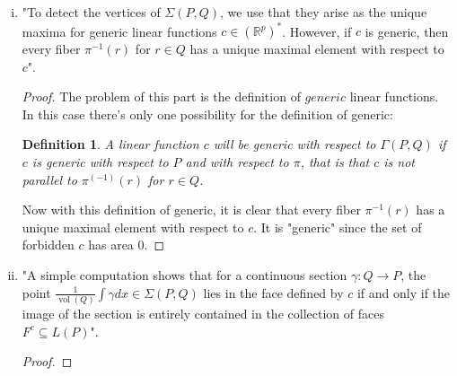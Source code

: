 \documentclass[11pt]{article}
\newtheorem{definition}{Definition}[section]
\DeclareMathOperator{\vol}{vol}
\begin{document}
\begin{enumerate}
\begin{enumerate}[(i)]
\begin{proof}

\end{proof}


\item "To detect the vertices of $\Sigma(P, Q)$, we use that they arise as the unique maxima for generic linear functions $c \in (\mathbb{R}^p)^*$. However, if $c$ is generic, then
every fiber $\pi^{-1}(r)$ for $ r \in Q$ has a unique maximal element with respect to $c$".

\begin{proof}
The problem of this part is the definition of $generic$ linear functions. In this case there's only one possibility for the definition of generic:

\begin{definition}
A linear function $c$ will be generic with respect to $\Gamma(P,Q)$ if $c$ is generic with respect to $P$ and with respect to $\pi$, that is that $c$ is not parallel to $\pi^{(-1)}(r)$ for $r \in Q$.
\end{definition}

Now with this definition of generic, it is clear that every fiber $\pi^{-1}(r)$ has a unique maximal element with respect to $c$. It is "generic" since the set of forbidden $c$ has area 0.
\end{proof}


\item "A simple computation shows that for a continuous section $\gamma:Q \rightarrow P$, the point $\frac{1}{\vol(Q)}\int \gamma dx \in \Sigma(P,Q)$ lies in the face defined by $c$ if and only if the image of the section is entirely contained in the collection of faces $F^c \subseteq L(P)$".

\begin{proof}

\end{proof}


\end{enumerate}


\end{enumerate}
\end{document}
